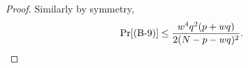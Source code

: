\begin{proof}
Similarly by symmetry,
%
\begin{align*}
\Pr[\text{(B-9)}] 
\leq
\frac{w^4q^2(p+wq)}{2(N-p-wq)^2}.
\end{align*}
%
%
%


%
%
%
%
%
%
%


\end{proof}
